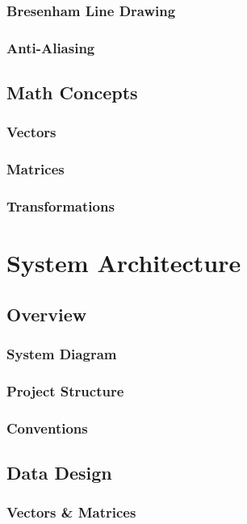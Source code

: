 \documentclass{article}
\begin{document}
\subsubsection{Bresenham Line Drawing}
\subsubsection{Anti-Aliasing}

\subsection{Math Concepts}
\subsubsection{Vectors}
\subsubsection{Matrices}
\subsubsection{Transformations}

\section{System Architecture}

\subsection{Overview}
\subsubsection{System Diagram}
\subsubsection{Project Structure}
\subsubsection{Conventions}

\subsection{Data Design}
\subsubsection{Vectors \& Matrices}
\end{document}
